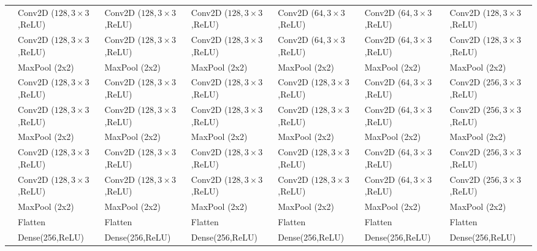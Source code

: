 \begin{table}
\begin{tabular}{l|l|l|l|l|l|l}
         &Conv2D ($128,3\times3$,ReLU) & Conv2D ($128,3\times3$,ReLU) & Conv2D ($128,3\times3$,ReLU) & Conv2D ($64,3\times3$,ReLU) & Conv2D ($64,3\times3$,ReLU) & Conv2D ($128,3\times3$,ReLU) \\
         
         &Conv2D ($128,3\times3$,ReLU) & Conv2D ($128,3\times3$,ReLU) & Conv2D ($128,3\times3$,ReLU) & Conv2D ($64,3\times3$,ReLU) & Conv2D ($64,3\times3$,ReLU) & Conv2D ($128,3\times3$,ReLU) \\
         
         &MaxPool (2x2) & MaxPool (2x2) & MaxPool (2x2) & MaxPool (2x2) & MaxPool (2x2) & MaxPool (2x2) \\
         \midrule
         
         &Conv2D ($128,3\times3$,ReLU) & Conv2D ($128,3\times3$,ReLU) & Conv2D ($128,3\times3$,ReLU) & Conv2D ($128,3\times3$,ReLU) & Conv2D ($64,3\times3$,ReLU) & Conv2D ($256,3\times3$,ReLU) \\
         
         &Conv2D ($128,3\times3$,ReLU) & Conv2D ($128,3\times3$,ReLU) & Conv2D ($128,3\times3$,ReLU) & Conv2D ($128,3\times3$,ReLU) & Conv2D ($64,3\times3$,ReLU) & Conv2D ($256,3\times3$,ReLU) \\
         
         &MaxPool (2x2) & MaxPool (2x2) & MaxPool (2x2) & MaxPool (2x2) & MaxPool (2x2) & MaxPool (2x2) \\
         \midrule         
         
         &Conv2D ($128,3\times3$,ReLU) & Conv2D ($128,3\times3$,ReLU) & Conv2D ($128,3\times3$,ReLU) & Conv2D ($128,3\times3$,ReLU) & Conv2D ($64,3\times3$,ReLU) & Conv2D ($256,3\times3$,ReLU) \\
         
         &Conv2D ($128,3\times3$,ReLU) & Conv2D ($128,3\times3$,ReLU) & Conv2D ($128,3\times3$,ReLU) & Conv2D ($128,3\times3$,ReLU) & Conv2D ($64,3\times3$,ReLU) & Conv2D ($256,3\times3$,ReLU) \\
         
         &MaxPool (2x2) & MaxPool (2x2) & MaxPool (2x2) & MaxPool (2x2) & MaxPool (2x2) & MaxPool (2x2) \\
         \midrule          
         
         &Flatten & Flatten & Flatten & Flatten & Flatten & Flatten \\
         
         &Dense(256,ReLU) & Dense(256,ReLU) & Dense(256,ReLU) & Dense(256,ReLU) & Dense(256,ReLU) & Dense(256,ReLU) \\
         

\end{tabular}
\end{table}

